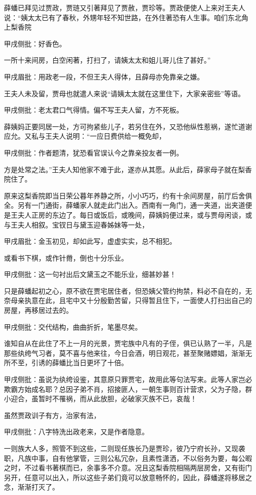 \begin{parag}
    薛蟠已拜见过贾政，贾琏又引著拜见了贾赦，贾珍等。贾政便使人上来对王夫人说：“姨太太已有了春秋，外甥年轻不知世路，在外住著恐有人生事。咱们东北角上梨香院\begin{note}甲戌侧批：好香色。\end{note}一所十来间房，白空闲著，打扫了，请姨太太和姐儿哥儿住了甚好。”\begin{note}甲戌眉批：用政老一段，不但王夫人得体，且薛母亦免靠亲之嫌。\end{note}王夫人未及留，贾母也就遣人来说“请姨太太就在这里住下，大家亲密些”等语。\begin{note}甲戌侧批：老太君口气得情。偏不写王夫人留，方不死板。\end{note}薛姨妈正要同居一处，方可拘紧些儿子，若另住在外，又恐他纵性惹祸，遂忙道谢应允。又私与王夫人说明：“一应日费供给一概免却，\begin{note}甲戌侧批：作者题清，犹恐看官误认今之靠亲投友者一例。\end{note}方是处常之法。”王夫人知他家不难于此，遂亦从其愿。从此后，薛家母子就在梨香院住了。
\end{parag}


\begin{parag}
    原来这梨香院即当日荣公暮年养静之所，小小巧巧，约有十余间房屋，前厅后舍俱全。另有一门通街，薛蟠家人就走此门出入。西南有一角门，通一夹道，出夹道便是王夫人正房的东边了。每日或饭后，或晚间，薛姨妈便过来，或与贾母闲谈，或与王夫人相叙。宝钗日与黛玉迎春姊妹等一处，\begin{note}甲戌眉批：金玉初见，却如此写，虚虚实实，总不相犯。\end{note}或看书下棋，或作针黹，倒也十分乐业。\begin{note}甲戌侧批：这一句衬出后文黛玉之不能乐业，细甚妙甚！\end{note}只是薛蟠起初之心，原不欲在贾宅居住者，但恐姨父管约拘禁，料必不自在的，无奈母亲执意在此，且宅中又十分殷勤苦留，只得暂且住下，一面使人打扫出自己的房屋，再移居过去的。\begin{note}甲戌侧批：交代结构，曲曲折折，笔墨尽矣。\end{note}谁知自从在此住了不上一月的光景，贾宅族中凡有的子侄，俱已认熟了一半，凡是那些纨绔气习者，莫不喜与他来往，今日会酒，明日观花，甚至聚赌嫖娼，渐渐无所不至，引诱的薛蟠比当日更坏了十倍。\begin{note}甲戌侧批：虽说为纨绔设鉴，其意原只罪贾宅，故用此等句法写来。此等人家岂必欺霸方始成名耶？总因子弟不肖，招接匪人，一朝生事则百计营求，父为子隐，群小迎合，虽暂时不罹祸，而从此放胆，必破家灭族不已，哀哉！\end{note}虽然贾政训子有方，治家有法，\begin{note}甲戌侧批：八字特洗出政老来，又是作者隐意。\end{note}一则族大人多，照管不到这些，二则现任族长乃是贾珍，彼乃宁府长孙，又现袭职，凡族中事，自有他掌管，三则公私冗杂，且素性潇洒，不以俗务为要，每公暇之时，不过看书著棋而已，余事多不介意。况且这梨香院相隔两层房舍，又有街门另开，任意可以出入，所以这些子弟们竟可以放意畅怀的，因此，薛蟠遂将移居之念，渐渐打灭了。
\end{parag}


